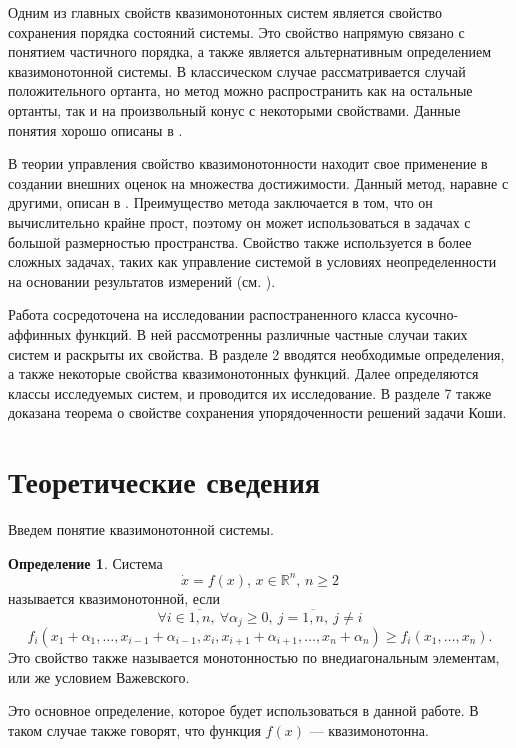 \documentclass{article}
\renewcommand{\ge}{\geqslant}
\theoremstyle{definition}
\newtheorem{definition}{Определение}[section]
\begin{document}
Одним из главных свойств квазимонотонных систем является свойство сохранения порядка состояний системы. Это свойство напрямую связано с понятием частичного порядка, а также является альтернативным определением квазимонотонной системы. В классическом случае рассматривается случай положительного ортанта, но метод можно распространить как на остальные ортанты, так и на произвольный конус с некоторыми свойствами. Данные понятия хорошо описаны в \cite{2}.

В теории управления свойство квазимонотонности находит свое применение в создании внешних оценок на множества достижимости. Данный метод, наравне с другими, описан в \cite{1}. Преимущество метода заключается в том, что он вычислительно крайне прост, поэтому он может использоваться в задачах с большой размерностью пространства. Свойство также используется в более сложных задачах, таких как управление системой в условиях неопределенности на основании результатов измерений (см. \cite{4}).

Работа сосредоточена на исследовании распостраненного класса кусочно-аффинных функций. В ней рассмотренны различные частные случаи таких систем и раскрыты их свойства. В разделе 2 вводятся необходимые определения, а также некоторые свойства квазимонотонных функций. Далее определяются классы исследуемых систем, и проводится их исследование. В разделе 7 также доказана теорема о свойстве сохранения упорядоченности решений задачи Коши.

\section{Теоретические сведения}
Введем понятие квазимонотонной системы.
\begin{definition} 
    Система
    \begin{equation} \label{sys}
        \dot x = f(x),\, x \in \mathbb{R}^n,\, n \ge 2 
    \end{equation}
    называется квазимонотонной, если
    \[\forall i \in \overline{1,n},\ \forall \alpha_j \ge 0,\ j = \overline{1,n},\ j \ne i\]
    \begin{equation} \label{qm}
	    f_i(x_1+\alpha_1,\dots,x_{i-1} + \alpha_{i-1},x_i,x_{i+1}+\alpha_{i+1},\dots,x_n+\alpha_n) \ge f_i(x_1,\dots,x_n).
    \end{equation}
    Это свойство также называется монотонностью по внедиагональным элементам, или же условием Важевского.
\end{definition}
Это основное определение, которое будет использоваться в данной работе. В таком случае также говорят, что функция \(f(x)\) --- квазимонотонна.
\end{document}
